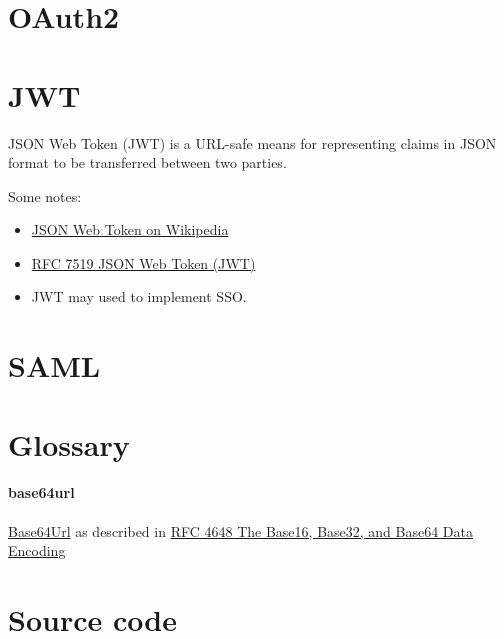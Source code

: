 \documentclass{article}
\begin{document}
\section{OAuth2}


\section{JWT}

JSON Web Token (JWT) is a URL-safe means for representing
claims in JSON format to be transferred between two parties.

Some notes:

\begin{itemize}
  \item \href{https://en.wikipedia.org/wiki/JSON_Web_Token}{%
     JSON Web Token on Wikipedia}
  \item \href{https://tools.ietf.org/html/rfc7519}{%
     RFC 7519 JSON Web Token (JWT)}
 \item JWT may used to implement SSO.
\end{itemize}


\section{SAML}


\appendix

\section{Glossary}

\paragraph{base64url} \href{https://en.wikipedia.org/wiki/Base64#URL_applications}{%
  Base64Url} as described in \href{https://tools.ietf.org/html/rfc4648}{%
    RFC 4648 The Base16, Base32, and Base64 Data Encoding}

\section{Source code}
\end{document}
